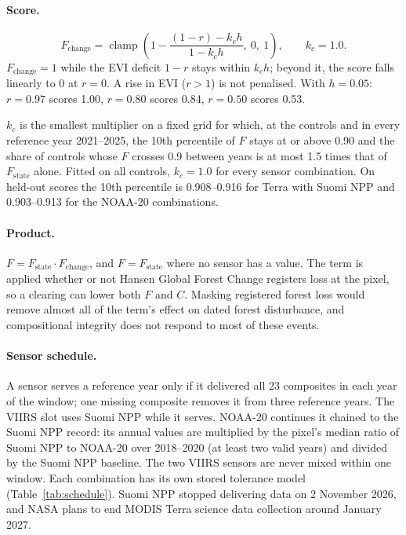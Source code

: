 \documentclass[11pt,a4paper]{article}
\DeclareMathOperator{\clamp}{clamp}
\begin{document}
\paragraph{Score.}
\begin{equation}
F_{\text{change}} = \clamp\!\left(1 - \frac{(1 - r) - k_c h}{1 - k_c h},\ 0,\ 1\right), \qquad
k_c = 1.0.
\end{equation}
$F_{\text{change}} = 1$ while the EVI deficit $1 - r$ stays within $k_c h$; beyond it, the score
falls linearly to 0 at $r = 0$. A rise in EVI ($r > 1$) is not penalised. With $h = 0.05$:
$r = 0.97$ scores 1.00, $r = 0.80$ scores 0.84, $r = 0.50$ scores 0.53.

$k_c$ is the smallest multiplier on a fixed grid for which, at the controls and in every reference
year 2021--2025, the 10th percentile of $F$ stays at or above 0.90 and the share of controls whose
$F$ crosses 0.9 between years is at most 1.5 times that of $F_{\text{state}}$ alone. Fitted on
all controls, $k_c = 1.0$ for every sensor combination. On held-out scores the 10th percentile is
0.908--0.916 for Terra with Suomi NPP and 0.903--0.913 for the NOAA-20 combinations.

\paragraph{Product.} $F = F_{\text{state}} \cdot F_{\text{change}}$, and $F = F_{\text{state}}$
where no sensor has a value. The term is applied whether or not Hansen Global Forest Change \citep{hansen2013}
registers loss at the pixel, so a clearing can lower both $F$ and $C$. Masking registered forest
loss would remove almost all of the term's effect on dated forest disturbance, and compositional
integrity does not respond to most of these events.

\paragraph{Sensor schedule.} A sensor serves a reference year only if it delivered all 23
composites in each year of the window; one missing composite removes it from three reference
years. The VIIRS slot uses Suomi NPP while it serves. NOAA-20 continues it chained to the Suomi
NPP record: its annual values are multiplied by the pixel's median ratio of Suomi NPP to NOAA-20
over 2018--2020 (at least two valid years) and divided by the Suomi NPP baseline. The two VIIRS
sensors are never mixed within one window. Each combination has its own stored tolerance model
(Table~\ref{tab:schedule}). Suomi NPP stopped delivering data on 2 November 2026, and NASA plans
to end MODIS Terra science data collection around January 2027.
\end{document}
